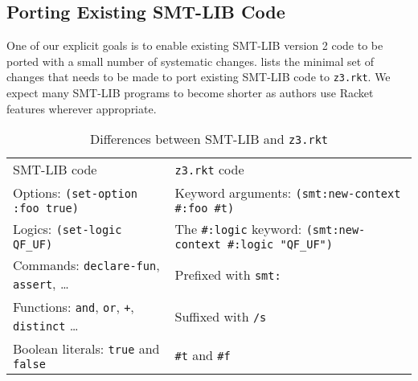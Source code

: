 \subsection{Porting Existing SMT-LIB Code}
\label{sec:porting-smt-lib}

One of our explicit goals is to enable existing SMT-LIB version 2 code to be
ported with a small number of systematic changes. 
lists the minimal set of changes that needs to be made to port
existing SMT-LIB code to \texttt{z3.rkt}. We expect many SMT-LIB programs
to become shorter as authors use Racket features wherever appropriate.

\begin{table}[hbt]
\caption{Differences between SMT-LIB and \texttt{z3.rkt}}
\label{tab:smt-porting}
\begin{center}
\begin{tabularx}{0.91\textwidth}{lX}
\hline\noalign{\smallskip}
SMT-LIB code & \texttt{z3.rkt} code \\
\noalign{\smallskip}
\hline
\noalign{\smallskip}
Options: \texttt{(set-option :foo true)} & Keyword arguments: \newline \texttt{(smt:new-context \#:foo \#t)} \\

Logics: \texttt{(set-logic QF\_UF)} & The \texttt{\#:logic} keyword: \newline \texttt{(smt:new-context \#:logic "QF\_UF")} \\

Commands: \texttt{declare-fun}, \texttt{assert}, \ldots & Prefixed with \texttt{smt:} \\

Functions: \texttt{and}, \texttt{or}, \texttt{+}, \texttt{distinct} \ldots & Suffixed with \texttt{/s} \\

Boolean literals: \texttt{true} and \texttt{false} & \texttt{\#t} and \texttt{\#f} \\

\hline
\end{tabularx}
\end{center}
\end{table}
